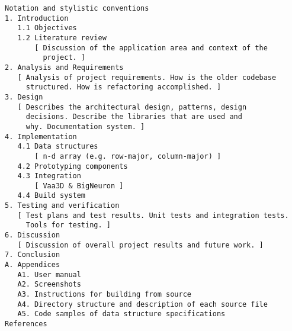 \documentclass[12pt]{report}
\begin{document}



\copyrightfalse \makecoverpages



\setlength{\parskip}{.1 in}

\makecontentspages







% 

\chapterpages

\newif \ifFIGS

\FIGSfalse

\begin{verbatim}
Notation and stylistic conventions
1. Introduction
   1.1 Objectives
   1.2 Literature review
       [ Discussion of the application area and context of the
         project. ]
2. Analysis and Requirements
   [ Analysis of project requirements. How is the older codebase
     structured. How is refactoring accomplished. ]
3. Design
   [ Describes the architectural design, patterns, design
     decisions. Describe the libraries that are used and
     why. Documentation system. ]
4. Implementation
   4.1 Data structures
       [ n-d array (e.g. row-major, column-major) ]
   4.2 Prototyping components
   4.3 Integration
       [ Vaa3D & BigNeuron ]
   4.4 Build system
5. Testing and verification
   [ Test plans and test results. Unit tests and integration tests.
     Tools for testing. ]
6. Discussion
   [ Discussion of overall project results and future work. ]
7. Conclusion
A. Appendices
   A1. User manual
   A2. Screenshots
   A3. Instructions for building from source
   A4. Directory structure and description of each source file
   A5. Code samples of data structure specifications
References
\end{verbatim}

%
%
%
%
%
%



\end{document}
